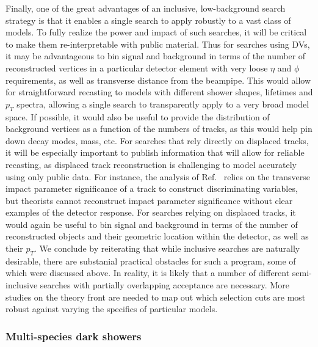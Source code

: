 Finally, one of the great advantages of an inclusive, low-background search strategy is that it enables a single search to apply robustly to a vast class of models.  To fully realize the power and impact of such searches, it will be critical to make them re-interpretable with public material.  Thus for searches using DVs, it may be advantageous to bin signal and background in terms of the number of reconstructed vertices in a particular detector element with very loose $\eta$ and $\phi$ requirements, as well as transverse distance from the beampipe. This would allow for straightforward recasting to models with different shower shapes, lifetimes and $p_T$ spectra, allowing a single search to transparently apply to a very broad model space.   If possible, it would also be useful to provide the distribution of background vertices as a function of the numbers of tracks, as this would help pin down decay modes, mass, etc. For searches that rely directly on displaced tracks, it will  be especially important to publish information that will allow for reliable recasting, as displaced track reconstruction is challenging to model accurately using only public data.  
  For instance, the analysis of Ref.~\cite{CMS-PAS-EXO-18-001} relies on the transverse impact parameter significance of a track to construct discriminating variables, but theorists cannot reconstruct impact parameter significance without clear examples of the detector response.   For searches relying on displaced tracks, it would again be useful to bin signal and background in terms of the number of reconstructed objects and their geometric location within the detector, as well as their $p_T$. We conclude by reiterating that while inclusive searches are naturally desirable, there are substanial practical obstacles for such a program, some of which were discussed above. In reality, it is likely that a number of different semi-inclusive searches with partially overlapping acceptance are necessary. More studies on the theory front are needed to map out which selection cuts are most robust against varying the specifics of particular models. 



\subsubsection{Multi-species dark showers \label{sec:darkshowersemivisible}}

